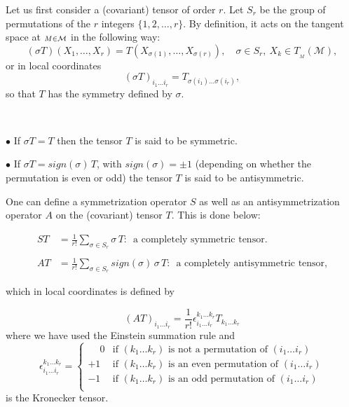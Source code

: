 Let us first consider a (covariant) tensor of order $r$. Let $S_{r} $ be the group of permutations of the $r$ integers $\{1,2,\dots,r\}$. By definition, it acts on the tangent space at $\scriptstyle M \in \mathcal{M}$ in the following way:
\[ (\sigma T)(X_{1},\dots,X_{r})= T(X_{\sigma (1)},\dots,X_{\sigma (r)}), \quad \sigma \in S_{r},\ X_{k}\in T_{_{M}}(\mathcal{ M}),\]
or in local coordinates
\[   (\sigma T)_{i_{1}\dots i_{r}}= T_{\sigma(i_{1})\dots \sigma (i_{r})}, \]
so that $T$ has the symmetry defined by $\sigma$.
\begin{definition} 

\ 

$\bullet$   If $\sigma T=T$  then the tensor $T$ is said to be symmetric.

\vspace{3pt}
$\bullet$  If $\sigma T=sign(\sigma)\,T$, with $sign(\sigma)=\pm1$ (depending on  whether the permutation is even or odd)  the tensor $T$ is said to be antisymmetric.
\end{definition}

One can define a symmetrization operator $S$ as well as an antisymmetrization operator $A$ on the (covariant) tensor $T$. This is done below: 

\begin{equation}\begin{aligned}
ST&=\frac{1}{r!}\sum\limits_{\sigma\in S_{r}} \sigma\, T:\,  \text{ a completely symmetric tensor.}\\\\
AT&= \frac{1}{r!}\sum\limits_{\sigma\in S_{r}} sign(\sigma)\,\sigma \,T:\,  \text{ a completely antisymmetric tensor,}
\end{aligned}\end{equation}

which in local coordinates is defined by 

\begin{equation}(AT)_{i_{1}\dots i_{r}}=\frac{1}{r!}\epsilon_{i_{1}\dots i_{r}}^{k_{1}\dots k_{r}}T_{k_{1}\dots k_{r}}\end{equation} where we have used the Einstein summation rule and 
\[ 
\epsilon_{i_{1}\dots i_{r}}^{k_{1}\dots k_{r}}=\begin{cases}
\phantom{+}0& \text{if } ( k_{1}\dots k_{r}) \text{ is not a permutation of } (i_{1}\dots i_{r})\\
+1& \text{if } ( k_{1}\dots k_{r}) \text{ is an even permutation of }(i_{1}\dots i_{r})\\
-1& \text{if } ( k_{1}\dots k_{r}) \text{ is an odd permutation of }(i_{1}\dots i_{r})\\
\end{cases}
\] 
is the Kronecker tensor.

